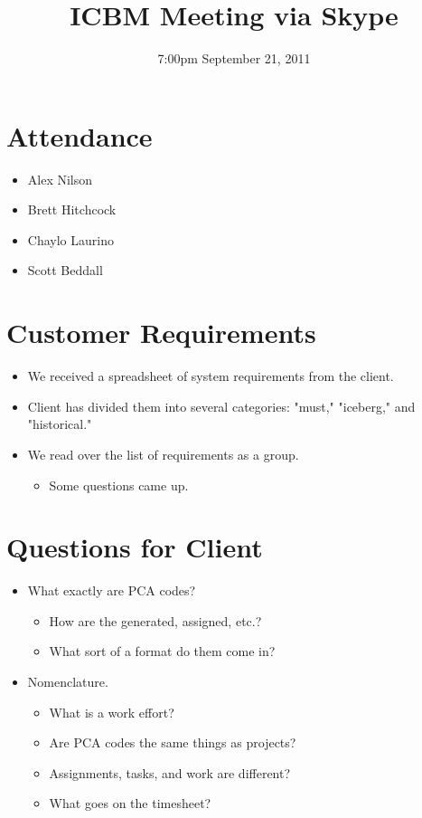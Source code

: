 \documentclass{article}
\begin{document}
\title{ICBM Meeting via Skype}
\date{7:00pm September 21, 2011}
\maketitle

\section{Attendance}
\begin{itemize}
\item Alex Nilson
\item Brett Hitchcock
\item Chaylo Laurino
\item Scott Beddall
\end{itemize}

\section{Customer Requirements}
\begin{itemize}
\item We received a spreadsheet of system requirements from the client.
\item Client has divided them into several categories: "must," "iceberg," and "historical."
\item We read over the list of requirements as a group.
	\begin{itemize}
	\item Some questions came up.
	\end{itemize}
\end{itemize}


\section{Questions for Client}
\begin{itemize}
\item What exactly are PCA codes? 
	\begin{itemize}
	\item How are the generated, assigned, etc.?
	\item What sort of a format do them come in?
	\end{itemize}
\item Nomenclature.
	\begin{itemize}
	\item What is a work effort?
	\item Are PCA codes the same things as projects?
	\item Assignments, tasks, and work are different?
	\item What goes on the timesheet?
	\end{itemize}
\end{itemize}
\end{document}
